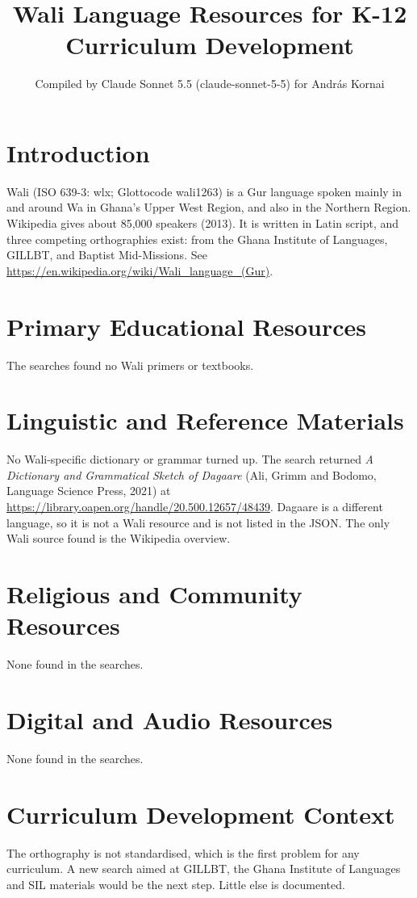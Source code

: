\documentclass[12pt]{article}
\title{Wali Language Resources for K-12 Curriculum Development}
\author{Compiled by Claude Sonnet 5.5 (claude-sonnet-5-5) for Andr\'as Kornai}
\date{}
\begin{document}
\maketitle

\section{Introduction}
Wali (ISO 639-3: wlx; Glottocode wali1263) is a Gur language spoken mainly in and around Wa in Ghana's Upper West Region, and also in the Northern Region. Wikipedia gives about 85,000 speakers (2013). It is written in Latin script, and three competing orthographies exist: from the Ghana Institute of Languages, GILLBT, and Baptist Mid-Missions. See \url{https://en.wikipedia.org/wiki/Wali_language_(Gur)}.

\section{Primary Educational Resources}
The searches found no Wali primers or textbooks.

\section{Linguistic and Reference Materials}
No Wali-specific dictionary or grammar turned up. The search returned \emph{A Dictionary and Grammatical Sketch of Dagaare} (Ali, Grimm and Bodomo, Language Science Press, 2021) at \url{https://library.oapen.org/handle/20.500.12657/48439}. Dagaare is a different language, so it is not a Wali resource and is not listed in the JSON. The only Wali source found is the Wikipedia overview.

\section{Religious and Community Resources}
None found in the searches.

\section{Digital and Audio Resources}
None found in the searches.

\section{Curriculum Development Context}
The orthography is not standardised, which is the first problem for any curriculum. A new search aimed at GILLBT, the Ghana Institute of Languages and SIL materials would be the next step. Little else is documented.
\end{document}
